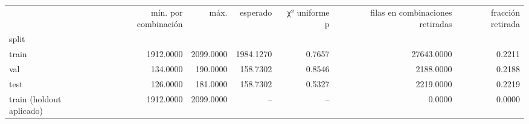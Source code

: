 \begin{tabular}{lrrrrrr}
\toprule
 & mín. por combinación & máx. & esperado & χ² uniforme p & filas en combinaciones retiradas & fracción retirada \\
split &  &  &  &  &  &  \\
\midrule
train & 1912.0000 & 2099.0000 & 1984.1270 & 0.7657 & 27643.0000 & 0.2211 \\
val & 134.0000 & 190.0000 & 158.7302 & 0.8546 & 2188.0000 & 0.2188 \\
test & 126.0000 & 181.0000 & 158.7302 & 0.5327 & 2219.0000 & 0.2219 \\
train (holdout aplicado) & 1912.0000 & 2099.0000 & -- & -- & 0.0000 & 0.0000 \\
\bottomrule
\end{tabular}
